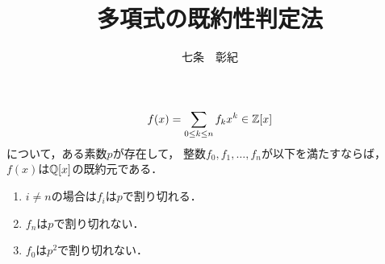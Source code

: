 \documentclass[a4j]{jsarticle}
\title{多項式の既約性判定法}
\author{七条　彰紀}
\begin{document}
\maketitle

\begin{Them}
    \[ f(x)=\sum_{0 \leq k \leq n}{f_k x^k} \in \mathbb{Z}[x] \]
    について，ある素数$p$が存在して，
    整数$f_0, f_1, \dots, f_n$が以下を満たすならば，
    $f(x)$は$\mathbb{Q}[x]$の既約元である．
    \begin{enumerate}
        \item $i \neq n$の場合は$f_i$は$p$で割り切れる．
        \item $f_n$は$p$で割り切れない．
        \item $f_0$は$p^2$で割り切れない．
    \end{enumerate}
\end{Them}
\end{document}
